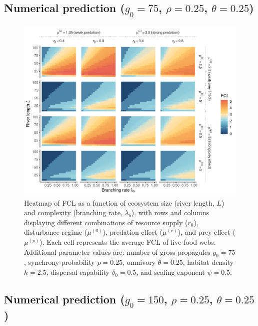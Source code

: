 \subsection{\texorpdfstring{Numerical prediction (\(g_0=75\),
\(\rho=0.25\),
\(\theta=0.25\))}{Numerical prediction (g\_0=75, \textbackslash rho=0.25, \textbackslash theta=0.25)}}\label{numerical-prediction-g_075-rho0.25-theta0.25}

\begin{figure}
\centering
\includegraphics{../data_fmt/fig_rho025_g75_theta025.pdf}
\caption{Heatmap of FCL as a function of ecosystem size (river length,
\(L\)) and complexity (branching rate, \(\lambda_b\)), with rows and
columns displaying different combinations of resource supply (\(r_0\)),
disturbance regime (\(\mu^{(0)}\)), predation effect (\(\mu^{(c)}\)),
and prey effect (\(\mu^{(p)}\)). Each cell represents the average FCL of
five food webs. Additional parameter values are: number of gross
propagules \(g_0=75\), synchrony probability \(\rho=0.25\), omnivory
\(\theta=0.25\), habitat density \(h=2.5\), dispersal capability
\(\delta_0=0.5\), and scaling exponent \(\psi=0.5\).}
\end{figure}

\newpage

\subsection{\texorpdfstring{Numerical prediction (\(g_0=150\),
\(\rho=0.25\),
\(\theta=0.25\))}{Numerical prediction (g\_0=150, \textbackslash rho=0.25, \textbackslash theta=0.25)}}\label{numerical-prediction-g_0150-rho0.25-theta0.25}

